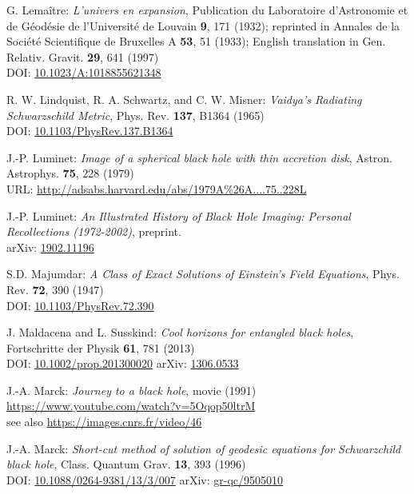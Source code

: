 \begin{thebibliography}{123}
G. Lemaître: {\em L'univers en expansion},
Publication du Laboratoire d'Astronomie et de Géodésie de l'Université
de Louvain {\bf 9},  171 (1932); reprinted in
Annales de la Société Scientifique de Bruxelles A {\bf 53}, 51 (1933);
English translation in
Gen. Relativ. Gravit. {\bf 29}, 641 (1997)\\
DOI: \href{https://doi.org/10.1023/A:1018855621348}{10.1023/A:1018855621348}

R. W. Lindquist, R. A. Schwartz, and C. W. Misner:
{\em Vaidya's Radiating Schwarzschild Metric},
Phys. Rev. {\bf 137}, B1364 (1965)\\
DOI: \href{https://doi.org/10.1103/PhysRev.137.B1364}{10.1103/PhysRev.137.B1364}

J.-P. Luminet: {\em Image of a spherical black hole with thin accretion disk},
Astron. Astrophys. {\bf 75}, 228 (1979)\\
URL: \url{http://adsabs.harvard.edu/abs/1979A%26A....75..228L}

J.-P. Luminet:
{\em An Illustrated History of Black Hole Imaging: Personal Recollections (1972-2002)}, preprint.\\
arXiv: \href{https://arxiv.org/abs/1902.11196}{1902.11196}

S.D. Majumdar:
{\em A Class of Exact Solutions of Einstein's Field Equations},
Phys. Rev. {\bf 72}, 390 (1947)\\
DOI: \href{https://doi.org/10.1103/PhysRev.72.390}{10.1103/PhysRev.72.390}

J. Maldacena and L. Susskind:
{\em Cool horizons for entangled black holes},
Fortschritte der Physik {\bf 61}, 781 (2013)\\
DOI: \href{https://doi.org/10.1002/prop.201300020}{10.1002/prop.201300020}\hfill
arXiv: \href{https://arxiv.org/abs/1306.0533}{1306.0533}

J.-A. Marck:
{\em Journey to a black hole}, movie (1991)\\
\url{https://www.youtube.com/watch?v=5Oqop50ltrM}\\
see also \url{https://images.cnrs.fr/video/46}

J.-A. Marck:
{\em Short-cut method of solution of geodesic equations for Schwarzchild black hole},
Class. Quantum Grav. {\bf 13}, 393 (1996)\\
DOI: \href{https://doi.org/10.1088/0264-9381/13/3/007}{10.1088/0264-9381/13/3/007}\hfill
arXiv: \href{https://arxiv.org/abs/gr-qc/9505010}{gr-qc/9505010}


\end{thebibliography}
